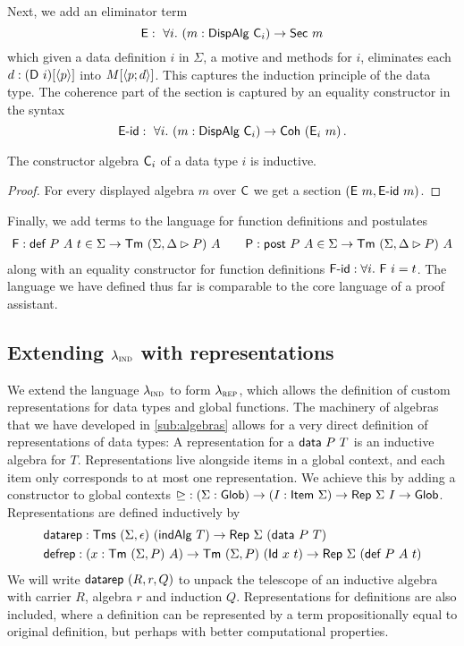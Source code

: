 Next, we add an eliminator term
\[
	\textsf{E} :\ \forall i.\ (m : \textsf{DispAlg}\ \textsf{C}_i) \to \textsf{Sec}\ m
\]
which given a data definition $i$ in $\Sigma$, a motive and methods for $i$,
eliminates each $d : (\textsf{D}\ i)[\langle p\rangle]$ into $M[\langle p;d\rangle]$. This captures
the induction principle of the data type. The coherence part of the section is
captured by an equality constructor in the syntax
\[
	\textsf{E-id} :\ \forall i.\ (m : \textsf{DispAlg}\ \textsf{C}_i) \to \textsf{Coh}\ (\textsf{E}_i\ m) \,.
\]
\vspace{-2em}
\begin{lemma}
	The constructor algebra $\textsf{C}_i$ of a data type $i$ is inductive.
	\begin{proof}
		For every displayed algebra $m$ over $\textsf{C}$ we get a section $(\textsf{E}\ m, \textsf{E-id}\ m)$.
	\end{proof}
\end{lemma}

Finally, we add terms to the language for function definitions and postulates
\begin{align*}
	\textsf{F} : \textsf{def}\ P\ A\ t \in \Sigma \to \textsf{Tm}\ (\Sigma, \Delta \rhd P)\ A \qquad \textsf{P} : \textsf{post}\ P\ A \in \Sigma \to \textsf{Tm}\ (\Sigma, \Delta \rhd P)\ A
\end{align*}
along with an equality constructor for function definitions $\textsf{F-id} : \forall i.\ \textsf{F}\ i = t$.
The language we have defined thus far is comparable to the core language of a
proof assistant.

\subsection{Extending $\lambda_{\textsc{ind}}$ with representations} \label{sub:lambdarep}

We extend the language $\lambda_{\textsc{ind}}$ to form $\lambda_{\textsc{rep}}$, which allows the
definition of custom representations for data types and global functions. The
machinery of algebras that we have developed in \cref{sub:algebras} allows for a
very direct definition of representations of data types: A representation for a
$\textsf{data}\ P\ T$ is an inductive algebra for $T$.
Representations live alongside items in a global context, and each item only corresponds
to at most one representation. We achieve this by adding a constructor to global contexts
$\unrhd : (\Sigma : \textsf{Glob}) \to (I : \textsf{Item}\ \Sigma) \to \textsf{Rep}\ \Sigma\ I \to \textsf{Glob}$.
Representations are defined inductively by
\begin{align*}
& \textsf{datarep} : \textsf{Tms}\ (\Sigma, \epsilon)\ (\textsf{indAlg}\ T) \to \textsf{Rep}\ \Sigma\ (\textsf{data}\ P\ T) \\
& \textsf{defrep} : (x : \textsf{Tm}\ (\Sigma, P)\ A) \to \textsf{Tm}\ (\Sigma, P)\ (\textsf{Id}\ x\ t) \to \textsf{Rep}\ \Sigma\ (\textsf{def}\ P\ A\ t)
\end{align*}
We will write $\textsf{datarep}\ (R, r, Q)$ to unpack the telescope of an inductive
algebra with carrier $R$, algebra $r$ and induction
$Q$. Representations for definitions are also included, where a definition can
be represented by a term propositionally equal to original definition, but
perhaps with better computational properties.

